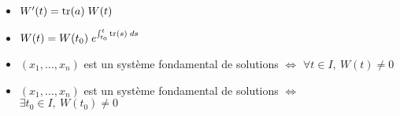\documentclass[11pt,a4paper,fleqn,pdftex]{report}
\begin{document}

\begin{prop}
\begin{itemize}
    \item $W'(t)=\mathrm{tr} (a)\; W(t)$
    \item $ W(t) = W(t_0) \; e^{\int_{t_0}^t \mathrm{tr} (s) \; ds}$
    \item $(x_1, \ldots ,x_n)$ est un système fondamental de solutions $\Longleftrightarrow$ $\forall t\in I,\: W(t) \neq 0$
    \item $(x_1, \ldots ,x_n)$ est un système fondamental de solutions $\Longleftrightarrow$ $\exists t_0\in I,\: W(t_0) \neq 0$
\end{itemize}
\end{prop}
\end{document}
